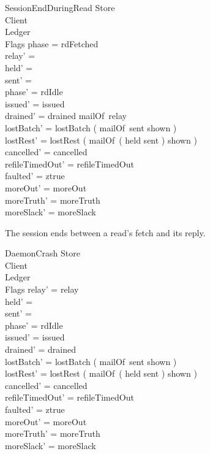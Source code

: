 \documentclass[a4paper,10pt,fleqn]{article}
\begin{document}
\begin{schema}{SessionEndDuringRead}
  \Delta Store \\
  \Xi Client \\
  \Delta Ledger \\
  \Delta Flags
  \where
  phase = rdFetched \\
  relay' = \emptyset \\
  held' = \emptyset \\
  sent' = \emptyset \\
  phase' = rdIdle \\
  issued' = issued \\
  drained' = drained \cup mailOf~relay \\
  lostBatch' = lostBatch \cup ( mailOf~sent \setminus shown ) \\
  lostRest' = lostRest \cup ( mailOf~( held \setminus sent ) \setminus shown ) \\
  cancelled' = cancelled \\
  refileTimedOut' = refileTimedOut \\
  faulted' = ztrue \\
  moreOut' = moreOut \\
  moreTruth' = moreTruth \\
  moreSlack' = moreSlack
\end{schema}

The session ends between a read's fetch and its reply.

\begin{schema}{DaemonCrash}
  \Delta Store \\
  \Xi Client \\
  \Delta Ledger \\
  \Delta Flags
  \where
  relay' = relay \\
  held' = \emptyset \\
  sent' = \emptyset \\
  phase' = rdIdle \\
  issued' = issued \\
  drained' = drained \\
  lostBatch' = lostBatch \cup ( mailOf~sent \setminus shown ) \\
  lostRest' = lostRest \cup ( mailOf~( held \setminus sent ) \setminus shown ) \\
  cancelled' = cancelled \\
  refileTimedOut' = refileTimedOut \\
  faulted' = ztrue \\
  moreOut' = moreOut \\
  moreTruth' = moreTruth \\
  moreSlack' = moreSlack
\end{schema}
\end{document}
